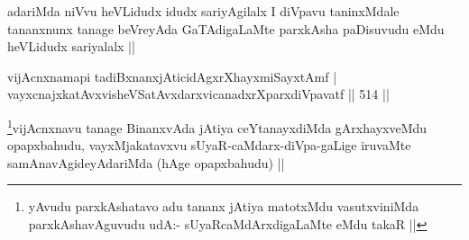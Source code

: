 \begin{artha}
adariMda niVvu heVLidudx idudx sariyAgilalx I diVpavu taninxMdale tananxnunx tanage beVreyAda GaTAdigaLaMte parxkAsha paDisuvudu eMdu heVLidudx sariyalalx ||
\end{artha}


\begin{shl}
vijAcnxnamapi tadiBxnanxjAticidAgxrXhayxmiSayxtAmf | \\
vayxcnajxkatAvxvisheVSatAvxdarxvicanadxrXparxdiVpavatf \hfill||  514 ||  
\end{shl}

\begin{artha}
\footnote{yAvudu parxkAshatavo adu tananx jAtiya matotxMdu vasutxviniMda parxkAshavAguvudu udA:- sUyaRcaMdArxdigaLaMte eMdu takaR ||}vijAcnxnavu tanage BinanxvAda jAtiya ceYtanayxdiMda gArxhayxveMdu opapxbahudu, vayxMjakatavxvu sUyaR-caMdarx-diVpa-gaLige iruvaMte samAnavAgideyAdariMda (hAge opapxbahudu) ||
\end{artha}
